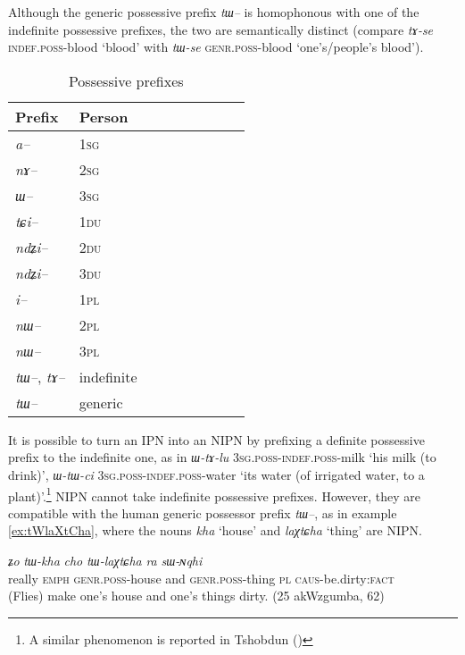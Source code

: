 \documentclass[oldfontcommands,oneside,a4paper,11pt]{article}
\newcommand{\ipa}[1]{{\phon\textit{#1}}} %
\begin{document}
Although the generic possessive prefix \ipa{tɯ--} is homophonous with one of the indefinite possessive prefixes, the two are semantically distinct (compare \ipa{tɤ-se} \textsc{indef.poss}-blood `blood' with \ipa{tɯ-se} \textsc{genr.poss}-blood `one's/people's blood').

\begin{table}[h] \centering
\caption{Possessive prefixes }\label{tab:possessive}
\begin{tabular}{lllllllll} 
\toprule
 Prefix & Person\\
\midrule
\ipa{a--}  & 1\textsc{sg} \\
\ipa{nɤ--}  & 2\textsc{sg}\\
\ipa{ɯ--}  & 3\textsc{sg}\\
\midrule
\ipa{tɕi--}  &  1\textsc{du} \\
\ipa{ndʑi--}  & 2\textsc{du} \\	
\ipa{ndʑi--}  & 3\textsc{du} \\	
\midrule
\ipa{i--}  & 1\textsc{pl} \\
\ipa{nɯ--}  & 2\textsc{pl} \\
\ipa{nɯ--}  & 3\textsc{pl} \\
\midrule
\ipa{tɯ--},  \ipa{tɤ--} & indefinite \\
\ipa{tɯ--}   &  generic \\
\bottomrule
\end{tabular}
\end{table}

It is possible to turn an IPN into an NIPN by prefixing a definite possessive prefix to the indefinite one, as in \ipa{ɯ-tɤ-lu} \textsc{3sg.poss-indef.poss}-milk `his milk (to drink)', \ipa{ɯ-tɯ-ci} \textsc{3sg.poss-indef.poss}-water `its water (of irrigated water, to a plant)'.\footnote{A similar phenomenon is reported in Tshobdun (\citealt[140]{jackson98morphology})} NIPN cannot take indefinite possessive prefixes. However, they are compatible with the human generic possessor prefix \ipa{tɯ--}, as in example \ref{ex:tWlaXtCha}, where the nouns \ipa{kha} `house' and \ipa{laχtɕha} `thing' are NIPN.

\begin{exe}
\ex \label{ex:tWlaXtCha}
\gll  \ipa{wuma}  	\ipa{ʑo}  	\ipa{tɯ-kha}  	\ipa{cho}  	\ipa{tɯ-laχtɕha}  	\ipa{ra}  	\ipa{sɯ-ɴqhi}  \\
really \textsc{emph} \textsc{genr.poss}-house and \textsc{genr.poss}-thing \textsc{pl} \textsc{caus}-be.dirty:\textsc{fact} \\
\glt (Flies) make one's house and one's things dirty. (25 akWzgumba, 62)
\end{exe}
\end{document}
